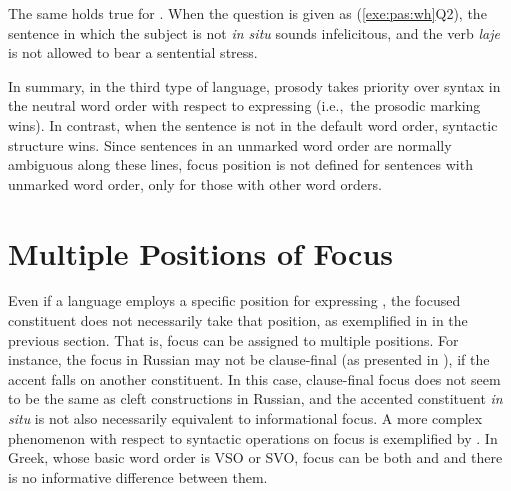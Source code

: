 The same holds true for .  When the
question is given as (\ref{exe:pas:wh}Q2), the sentence in which the
subject is not \textit{in situ} sounds infelicitous, and the verb
\textit{laje} is not allowed to bear a sentential stress.



In summary, in the third type of language, prosody takes priority over
syntax in the neutral word order with respect to expressing 
(i.e.,\ the prosodic marking wins). In contrast, when the sentence is
not in the default word order, syntactic structure wins.  Since
sentences in an unmarked word order are normally ambiguous along these
lines, focus position is not defined for sentences with unmarked word
order, only for those with other word orders.



\section{Multiple Positions of Focus}
\label{5:sec:multiple}











Even if a language employs a specific position for expressing ,
the focused constituent does not necessarily take that position, as
exemplified in  in the previous section. That is, focus
can be assigned to multiple positions.  For instance, the focus in
Russian may not be clause-final (as presented in ),
if the accent falls on another constituent. In this case, clause-final
focus does not seem to be the same as cleft constructions in Russian,
and the accented constituent \textit{in situ} is not also necessarily
equivalent to informational focus. A more complex phenomenon with
respect to syntactic operations on focus is exemplified by 
\citep{gryllia:09}. In Greek, whose basic word order is VSO or SVO,
focus can be both  and 
and there is no informative difference between them.


